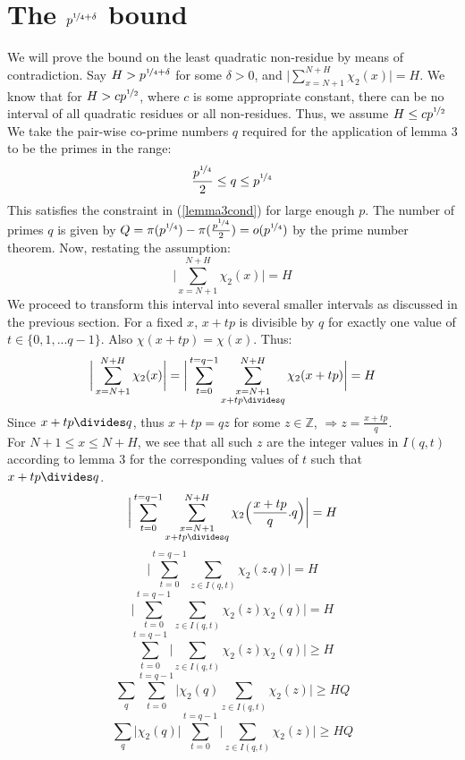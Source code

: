 \documentclass{report}
\begin{document}
\section{The $p^{\nicefrac{1}{4}+\delta}$ bound}
We will prove the bound on the least quadratic non-residue by means of contradiction. Say $H>p^{\nicefrac{1}{4}+\delta}$ for some $\delta>0$, and $\Big \lvert \sum\limits_{x=N+1}^{N+H}\chi_2(x)\Big \rvert=H$. We know that for $H>cp^{\nicefrac{1}{2}}$, where $c$ is some appropriate constant, there can be no interval of all quadratic residues or all non-residues. Thus, we assume $H\leq cp^{\nicefrac{1}{2}}$\\
We take the pair-wise co-prime numbers $q$ required for the application of lemma 3 to be the primes in the range:
$$\frac{p^{\nicefrac{1}{4}}}{2} \leq q \leq p^{\nicefrac{1}{4}}$$
This satisfies the constraint in (\ref{lemma3cond}) for large enough $p$. The number of primes $q$ is given by $Q=\pi(p^{\nicefrac{1}{4}})-\pi(\frac{p^{\nicefrac{1}{4}}}{2})=o(p^{\nicefrac{1}{4}})$ by the prime number theorem. Now, restating the assumption:
$$\bigg \lvert\sum\limits_{x=N+1}^{N+H}\chi_2(x)\bigg \rvert=H$$
We proceed to transform this interval into several smaller intervals as discussed in the previous section. For a fixed $x$, $x+tp$ is divisible by $q$ for exactly one value of $t\in\{0,1,...q-1\}$. Also $\chi(x+tp)=\chi(x)$. Thus:
$$\bigg \lvert\sum\limits_{x=N+1}^{N+H}\chi_2(x)\bigg \rvert=\bigg \lvert\sum\limits_{t=0}^{t=q-1}\sum\limits_{\substack{x=N+1\\x+tp\divides q}}^{N+H}\chi_2(x+tp)\bigg \rvert=H$$
Since $x+tp\divides q$, thus $x+tp=qz$ for some $z\in\mathbb{Z}$, $\Rightarrow z=\frac{x+tp}{q}$.\\
For $N+1\leq x \leq N+H$, we see that all such $z$ are the integer values in $I(q,t)$ according to lemma 3 for the corresponding values of $t$ such that $x+tp\divides q$.
$$\bigg \lvert\sum\limits_{t=0}^{t=q-1}\sum\limits_{\substack{x=N+1\\x+tp\divides q}}^{N+H} \chi_2 \Big(\frac{x+tp}{q}.q\Big)\bigg \rvert=H$$
$$\bigg \lvert\sum\limits_{t=0}^{t=q-1}\sum\limits_{z\in I(q,t)}\chi_2(z.q)\bigg \rvert=H$$
$$\bigg \lvert\sum\limits_{t=0}^{t=q-1}\sum\limits_{z\in I(q,t)}\chi_2(z)\chi_2(q)\bigg \rvert=H$$
$$\sum\limits_{t=0}^{t=q-1}\bigg \lvert\sum\limits_{z\in I(q,t)}\chi_2(z)\chi_2(q)\bigg \rvert \geq H$$
$$\sum_q\sum\limits_{t=0}^{t=q-1}\bigg \lvert\chi_2(q)\sum\limits_{z\in I(q,t)}\chi_2(z)\bigg \rvert \geq HQ$$
$$\sum_q\bigg \lvert\chi_2(q)\bigg\rvert\sum\limits_{t=0}^{t=q-1}\bigg\lvert\sum\limits_{z\in I(q,t)}\chi_2(z)\bigg \rvert \geq HQ$$
\end{document}
